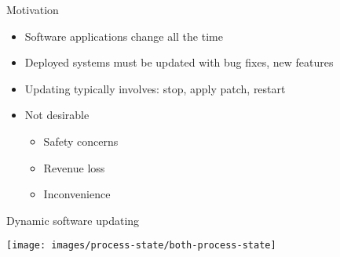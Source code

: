 

\begin{frame}{Motivation}%
\begin{itemize}
\item Software applications change all the time
\item Deployed systems must be updated with bug fixes, new features
\item Updating typically involves: stop, apply patch, restart
\item Not desirable
  \begin{itemize}
    \item Safety concerns
    \item Revenue loss
    \item Inconvenience
  \end{itemize}
\end{itemize}
\end{frame}

\begin{frame}{Dynamic software updating}%
\vspace*{-3mm}%
\begin{center}%
\texttt{[image: images/process-state/both-process-state]}%
\end{center}%
\end{frame}

